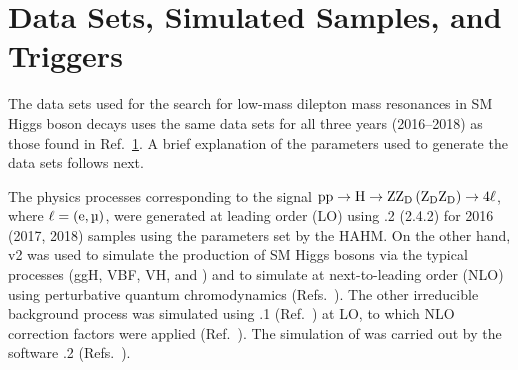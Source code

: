 \section{Data Sets, Simulated Samples, and Triggers}
The data sets used for the search for low-mass dilepton mass resonances in SM Higgs boson decays uses the same data sets for all three years (2016--2018) as those found in Ref.~\ref{}.
A brief explanation of the parameters used to generate the data sets follows next.

The physics processes corresponding to the signal $\mathrm{p} \mathrm{p} \to \mathrm{H} \to \mathrm{Z} \mathrm{Z}_\text{D} \left( \mathrm{Z}_\text{D} \mathrm{Z}_\text{D} \right) \to 4\ell$, where $\ell = (\Pe, \Pmu)$, were generated at leading order (LO) using .2 (2.4.2) for 2016 (2017, 2018) samples using the parameters set by the HAHM.
On the other hand, \POWHEG v2 was used to simulate the production of SM Higgs bosons via the typical processes (ggH, VBF, VH, and \ttbarh) and to simulate \qqzz at next-to-leading order (NLO) using perturbative quantum chromodynamics (Refs.~\cite{frixione_matching_2007, bagnaschi_higgs_2012, alioli_general_2010,nason_new_2004}).
The other irreducible background process \ggzz was simulated using .1 (Ref.~\cite{mcfm_campbell_precision_2019}) at LO, to which NLO correction factors were applied (Ref.~\cite{nlo_corr_grazzini_fully_2018}).
The simulation of \htofourl was carried out by the software .2 (Refs.~\cite{hdecay_gao_spin_2010, hdecay_bolognesi_spin_2012}).